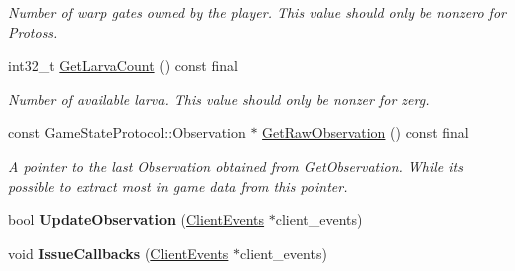 \begin{DoxyCompactItemize}
\begin{DoxyCompactList}\small\item\em Number of warp gates owned by the player. This value should only be nonzero for Protoss. \end{DoxyCompactList}\item 
\mbox{\label{classsc2_1_1_observation_imp_a357532eefc1ddccbc580773f9b939089}} 
int32\+\_\+t \hyperlink{classsc2_1_1_observation_imp_a357532eefc1ddccbc580773f9b939089}{Get\+Larva\+Count} () const final
\begin{DoxyCompactList}\small\item\em Number of available larva. This value should only be nonzer for zerg. \end{DoxyCompactList}\item 
const Game\+State\+Protocol\+::\+Observation $\ast$ \hyperlink{classsc2_1_1_observation_imp_ab77543fa1b95c5e348343129a21c84a3}{Get\+Raw\+Observation} () const final
\begin{DoxyCompactList}\small\item\em A pointer to the last Observation obtained from Get\+Observation. While it\textquotesingle{}s possible to extract most in game data from this pointer. \end{DoxyCompactList}\item 
\mbox{\label{classsc2_1_1_observation_imp_af32c4583c928b3db1028768787dda3f6}} 
bool {\bfseries Update\+Observation} (\hyperlink{classsc2_1_1_client_events}{Client\+Events} $\ast$client\+\_\+events)
\item 
\mbox{\label{classsc2_1_1_observation_imp_a9f40fe49b02f4e7476f18cc6b18fc369}} 
void {\bfseries Issue\+Callbacks} (\hyperlink{classsc2_1_1_client_events}{Client\+Events} $\ast$client\+\_\+events)
\end{DoxyCompactItemize}
